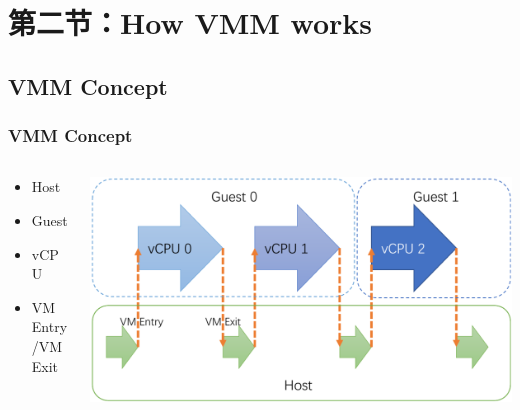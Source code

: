 \section{第二节：How VMM works} %
\subsection{VMM Concept}
% 
% 
% 
\begin{frame}
    \frametitle{VMM Concept}
    \begin{columns}
        \begin{column}{.3\textwidth}
            \begin{itemize}
                \item Host
                \item Guest
                \item vCPU
                \item VM Entry/VM Exit
            \end{itemize} 
        \end{column}
        \begin{column}{.7\textwidth}
            \includegraphics[width=1.\textwidth]{figs/VMM-concept.png}
        \end{column}
    \end{columns}

\end{frame}

